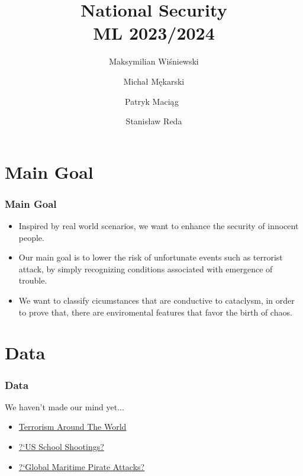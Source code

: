 \documentclass{beamer}
\title{ \large{National Security} \\ 
        \small{ML 2023/2024}}
\author{
    Maksymilian Wiśniewski \and
    Michał Mękarski \\ \and
    Patryk Maciąg  \and
    Stanisław Reda
}
\date{}
\begin{document}
\maketitle







\section{Main Goal}

\begin{frame}
    \frametitle{Main Goal}

    \begin{itemize}
        \item Inspired by real world scenarios, we want to enhance the 
        security of innocent people. \pause

        \item Our main goal is to lower the risk of unfortunate events
        such as terrorist attack, by simply recognizing conditions associated
        with emergence of trouble. \pause

        \item We want to classify cicumstances that are conductive to 
        cataclysm, in order to prove that, there are enviromental features 
        that favor the birth of chaos.
    \end{itemize}

\end{frame}


\section{Data}

\begin{frame}
    \frametitle{Data}

    We haven't made our mind yet...

    \pause

    \begin{itemize}
        \item \href{https://www.kaggle.com/code/ash316/terrorism-around-the-world}{Terrorism Around The World}
        \pause
        \item \href{https://www.kaggle.com/code/ecodan/us-school-shootings-dataset}{?`US School Shootings?}
        \pause
        \item \href{https://www.kaggle.com/code/zachbecker21/wip-eda-for-maritime-pirate-dataset}{?`Global Maritime Pirate Attacks?}

    \end{itemize}

\end{frame}
\end{document}
